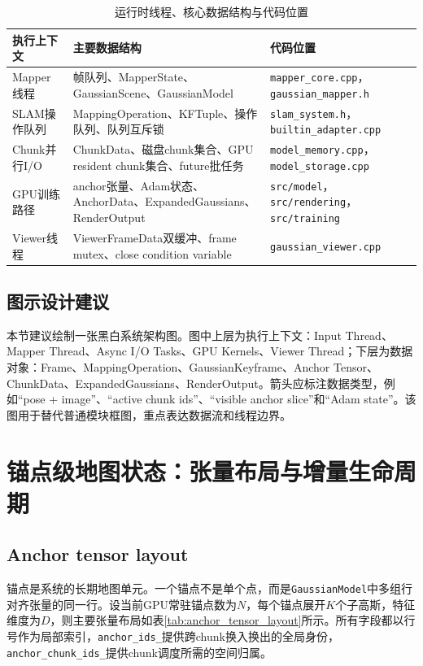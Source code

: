 \begin{table}[htbp]
\centering
\caption{运行时线程、核心数据结构与代码位置}
\label{tab:runtime_threads}
\begin{tabular}{p{3.0cm}p{5.2cm}p{4.8cm}}
\toprule
\textbf{执行上下文} & \textbf{主要数据结构} & \textbf{代码位置} \\
\midrule
Mapper线程 & 帧队列、MapperState、GaussianScene、GaussianModel & \texttt{mapper\_core.cpp}，\texttt{gaussian\_mapper.h} \\
SLAM操作队列 & MappingOperation、KFTuple、操作队列、队列互斥锁 & \texttt{slam\_system.h}，\texttt{builtin\_adapter.cpp} \\
Chunk并行I/O & ChunkData、磁盘chunk集合、GPU resident chunk集合、future批任务 & \texttt{model\_memory.cpp}，\texttt{model\_storage.cpp} \\
GPU训练路径 & anchor张量、Adam状态、AnchorData、ExpandedGaussians、RenderOutput & \texttt{src/model}，\texttt{src/rendering}，\texttt{src/training} \\
Viewer线程 & ViewerFrameData双缓冲、frame mutex、close condition variable & \texttt{gaussian\_viewer.cpp} \\
\bottomrule
\end{tabular}
\end{table}

\subsection{图示设计建议}

本节建议绘制一张黑白系统架构图。图中上层为执行上下文：Input Thread、Mapper Thread、Async I/O Tasks、GPU Kernels、Viewer Thread；下层为数据对象：Frame、MappingOperation、GaussianKeyframe、Anchor Tensor、ChunkData、ExpandedGaussians、RenderOutput。箭头应标注数据类型，例如``pose + image''、``active chunk ids''、``visible anchor slice''和``Adam state''。该图用于替代普通模块框图，重点表达数据流和线程边界。

\section{锚点级地图状态：张量布局与增量生命周期}

\subsection{Anchor tensor layout}

锚点是系统的长期地图单元。一个锚点不是单个点，而是\texttt{GaussianModel}中多组行对齐张量的同一行。设当前GPU常驻锚点数为$N$，每个锚点展开$K$个子高斯，特征维度为$D$，则主要张量布局如表\ref{tab:anchor_tensor_layout}所示。所有字段都以行号作为局部索引，\texttt{anchor\_ids\_}提供跨chunk换入换出的全局身份，\texttt{anchor\_chunk\_ids\_}提供chunk调度所需的空间归属。

